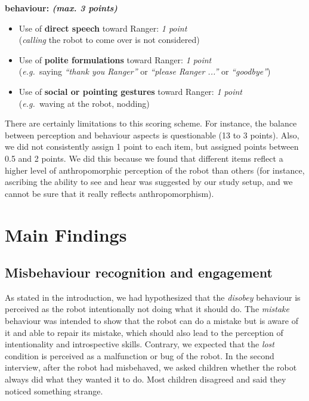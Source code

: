 \documentclass{sig-alternate}
\newcommand{\eg}{{\textit{e.g.~}}}
\begin{document}
\textbf{behaviour: \textit{(max. 3 points)}}
\begin{itemize}
	\item Use of \textbf{direct speech} toward Ranger: \textit{1 point}\\
	(\textit{calling} the robot to come over is not considered)
	\item Use of \textbf{polite formulations} toward Ranger: \textit{1 point}\\ 
	(\eg saying \textit{``thank you Ranger''} or \textit{``please Ranger ...''} or \textit{``goodbye''})
	\item Use of \textbf{social or pointing gestures} toward Ranger: \textit{1 point}\\ 
	(\eg waving at the robot, nodding)
\end{itemize}

There are certainly limitations to this scoring scheme. For instance, the
balance between perception and behaviour aspects is questionable (13 to 3
points). Also, we did not consistently assign 1 point to each item, but assigned
points between 0.5 and 2 points. We did this because we found that different
items reflect a higher level of anthropomorphic perception of the robot than
others (for instance, ascribing the ability to see and hear was suggested by our
study setup, and we cannot be sure that it really reflects anthropomorphism).

\section{Main Findings}

\subsection{Misbehaviour recognition and engagement}

As stated in the introduction, we had hypothesized that the \textit{disobey}
behaviour is perceived as the robot intentionally not doing what it should do.
The \textit{mistake} behaviour was intended to show that the robot can do a
mistake but is aware of it and able to repair its mistake, which should also
lead to the perception of intentionality and introspective skills.  Contrary, we expected that the
\textit{lost} condition is perceived as a malfunction or bug of the robot.  In
the second interview, after the robot had misbehaved, we asked children whether
the robot always did what they wanted it to do. Most children disagreed and said
they noticed something strange.
\end{document}
